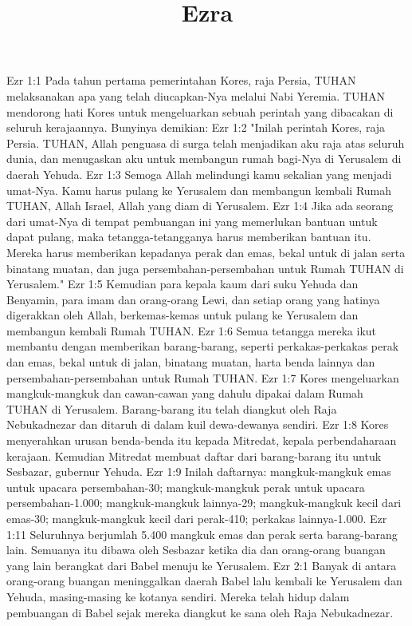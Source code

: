 

\title{Ezra}

Ezr 1:1  Pada tahun pertama pemerintahan Kores, raja Persia, TUHAN melaksanakan apa yang telah diucapkan-Nya melalui Nabi Yeremia. TUHAN mendorong hati Kores untuk mengeluarkan sebuah perintah yang dibacakan di seluruh kerajaannya. Bunyinya demikian:
Ezr 1:2  "Inilah perintah Kores, raja Persia. TUHAN, Allah penguasa di surga telah menjadikan aku raja atas seluruh dunia, dan menugaskan aku untuk membangun rumah bagi-Nya di Yerusalem di daerah Yehuda.
Ezr 1:3  Semoga Allah melindungi kamu sekalian yang menjadi umat-Nya. Kamu harus pulang ke Yerusalem dan membangun kembali Rumah TUHAN, Allah Israel, Allah yang diam di Yerusalem.
Ezr 1:4  Jika ada seorang dari umat-Nya di tempat pembuangan ini yang memerlukan bantuan untuk dapat pulang, maka tetangga-tetangganya harus memberikan bantuan itu. Mereka harus memberikan kepadanya perak dan emas, bekal untuk di jalan serta binatang muatan, dan juga persembahan-persembahan untuk Rumah TUHAN di Yerusalem."
Ezr 1:5  Kemudian para kepala kaum dari suku Yehuda dan Benyamin, para imam dan orang-orang Lewi, dan setiap orang yang hatinya digerakkan oleh Allah, berkemas-kemas untuk pulang ke Yerusalem dan membangun kembali Rumah TUHAN.
Ezr 1:6  Semua tetangga mereka ikut membantu dengan memberikan barang-barang, seperti perkakas-perkakas perak dan emas, bekal untuk di jalan, binatang muatan, harta benda lainnya dan persembahan-persembahan untuk Rumah TUHAN.
Ezr 1:7  Kores mengeluarkan mangkuk-mangkuk dan cawan-cawan yang dahulu dipakai dalam Rumah TUHAN di Yerusalem. Barang-barang itu telah diangkut oleh Raja Nebukadnezar dan ditaruh di dalam kuil dewa-dewanya sendiri.
Ezr 1:8  Kores menyerahkan urusan benda-benda itu kepada Mitredat, kepala perbendaharaan kerajaan. Kemudian Mitredat membuat daftar dari barang-barang itu untuk Sesbazar, gubernur Yehuda.
Ezr 1:9  Inilah daftarnya: mangkuk-mangkuk emas untuk upacara persembahan-30; mangkuk-mangkuk perak untuk upacara persembahan-1.000; mangkuk-mangkuk lainnya-29; mangkuk-mangkuk kecil dari emas-30; mangkuk-mangkuk kecil dari perak-410; perkakas lainnya-1.000.
Ezr 1:11  Seluruhnya berjumlah 5.400 mangkuk emas dan perak serta barang-barang lain. Semuanya itu dibawa oleh Sesbazar ketika dia dan orang-orang buangan yang lain berangkat dari Babel menuju ke Yerusalem.
Ezr 2:1  Banyak di antara orang-orang buangan meninggalkan daerah Babel lalu kembali ke Yerusalem dan Yehuda, masing-masing ke kotanya sendiri. Mereka telah hidup dalam pembuangan di Babel sejak mereka diangkut ke sana oleh Raja Nebukadnezar.
